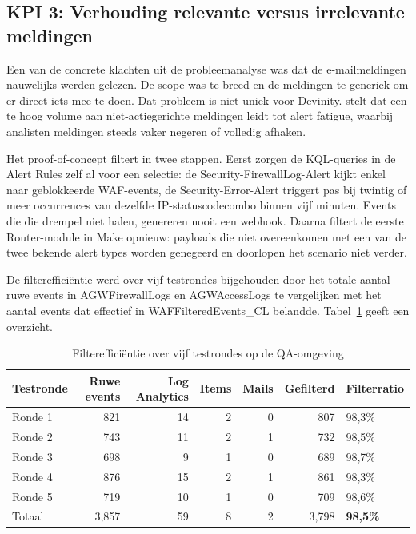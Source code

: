 
\subsection{KPI 3: Verhouding relevante versus irrelevante meldingen}
Een van de concrete klachten uit de probleemanalyse was dat de e-mailmeldingen nauwelijks werden gelezen. De scope was te breed en de meldingen te generiek om er direct iets mee te doen. Dat probleem is niet uniek voor Devinity. \autocite{10.1145/3723158} stelt dat een te hoog volume aan niet-actiegerichte meldingen leidt tot alert fatigue, waarbij analisten meldingen steeds vaker negeren of volledig afhaken.

Het proof-of-concept filtert in twee stappen. Eerst zorgen de KQL-queries in de Alert Rules zelf al voor een selectie: de Security-FirewallLog-Alert kijkt enkel naar geblokkeerde WAF-events, de Security-Error-Alert triggert pas bij twintig of meer occurrences van dezelfde IP-statuscodecombo binnen vijf minuten. Events die die drempel niet halen, genereren nooit een webhook. Daarna filtert de eerste Router-module in Make opnieuw: payloads die niet overeenkomen met een van de twee bekende alert types worden genegeerd en doorlopen het scenario niet verder.

De filterefficiëntie werd over vijf testrondes bijgehouden door het totale aantal ruwe events in AGWFirewallLogs en AGWAccessLogs te vergelijken met het aantal events dat effectief in WAFFilteredEvents\_CL belandde. Tabel~\ref{tab:filterratio} geeft een overzicht.

\begin{table}[H]
    \centering
    \caption{Filterefficiëntie over vijf testrondes op de QA-omgeving}
    \label{tab:filterratio}
    \small
    \begin{tabular}{lrrrrrl}
        \toprule
        \textbf{Testronde} & \textbf{Ruwe events} & \textbf{Log Analytics} & \textbf{Items} & \textbf{Mails} & \textbf{Gefilterd} & \textbf{Filterratio} \\
        \midrule
        Ronde 1 & 821  & 14 & 2 & 0 & 807  & 98,3\% \\
        Ronde 2 & 743  & 11 & 2 & 1 & 732  & 98,5\% \\
        Ronde 3 & 698  &  9 & 1 & 0 & 689  & 98,7\% \\
        Ronde 4 & 876  & 15 & 2 & 1 & 861  & 98,3\% \\
        Ronde 5 & 719  & 10 & 1 & 0 & 709  & 98,6\% \\
        \midrule
        Totaal & 3,857 & 59 & 8 & 2 & 3,798 & \textbf{98,5\%} \\
        \bottomrule
    \end{tabular}
\end{table}

